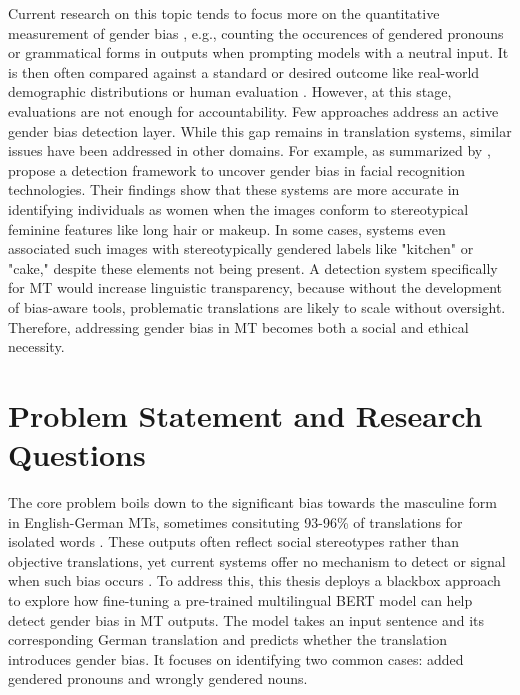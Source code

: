 Current research on this topic tends to focus more on the quantitative measurement of gender bias \citep{rescignoGenderBiasMachine2023,barclayInvestigatingMarkersDrivers2024a,smacchiaDoesAIReflect2024}, e.g., counting the occurences of gendered pronouns or grammatical forms in outputs when prompting models with a neutral input. It is then often compared against a standard or desired outcome like real-world demographic distributions \citep{smacchiaDoesAIReflect2024,pratesAssessingGenderBias2019} or human evaluation \citep{lardelliBuildingBridgesDataset2024,savoldiWhatHarmQuantifying2024}. However, at this stage, evaluations are not enough for accountability. Few approaches address an active gender bias detection layer. While this gap remains in translation systems, similar issues have been addressed in other domains. For example, as summarized by \citet{shresthaExploringGenderBiases2022}, \citet{schwemmerDiagnosingGenderBias2020} propose a detection framework to uncover gender bias in facial recognition technologies. Their findings show that these systems are more accurate in identifying individuals as women when the images conform to stereotypical feminine features like long hair or makeup. In some cases, systems even associated such images with stereotypically gendered labels like "kitchen" or "cake," despite these elements not being present. 
A detection system specifically for MT would increase linguistic transparency, because without the development of bias-aware tools, problematic translations are likely to scale without oversight. Therefore, addressing gender bias in MT becomes both a social and ethical necessity.

\section{Problem Statement and Research Questions}

The core problem boils down to the significant bias towards the masculine form in English-German MTs, sometimes consituting 93-96\% of translations for isolated words \citep{lardelliBuildingBridgesDataset2024}. These outputs often reflect social stereotypes rather than objective translations, yet current systems offer no mechanism to detect or signal when such bias occurs \citep{rescignoGenderBiasMachine2023}. To address this, this thesis deploys a blackbox approach to explore how fine-tuning a pre-trained multilingual BERT model can help detect gender bias in MT outputs. The model takes an input sentence and its corresponding German translation and predicts whether the translation introduces gender bias. It focuses on identifying two common cases: added gendered pronouns and wrongly gendered nouns.

